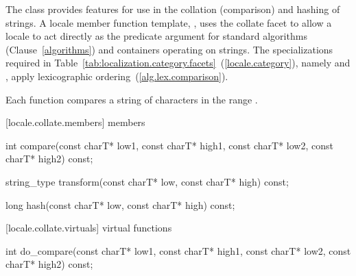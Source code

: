 \pnum
The class
provides features for use in the
collation (comparison) and hashing of strings.
A locale member function template,
,
uses the collate facet to allow a locale to act directly as the predicate
argument for standard algorithms (Clause~\ref{algorithms}) and containers operating on strings.
The specializations required in Table~\ref{tab:localization.category.facets}~(\ref{locale.category}), namely
and
,
apply lexicographic ordering~(\ref{alg.lex.comparison}).

\pnum
Each function compares a string of characters
in the range
.

[locale.collate.members]{ members}

%
\begin{itemdecl}
int compare(const charT* low1, const charT* high1,
            const charT* low2, const charT* high2) const;
\end{itemdecl}

\begin{itemdescr}
\pnum
\returns
{}
\end{itemdescr}

%
\begin{itemdecl}
string_type transform(const charT* low, const charT* high) const;
\end{itemdecl}

\begin{itemdescr}
\pnum
\returns
{}
\end{itemdescr}

%
\begin{itemdecl}
long hash(const charT* low, const charT* high) const;
\end{itemdecl}

\begin{itemdescr}
\pnum
\returns
{}
\end{itemdescr}

[locale.collate.virtuals]{ virtual functions}

%
\begin{itemdecl}
int do_compare(const charT* low1, const charT* high1,
               const charT* low2, const charT* high2) const;
\end{itemdecl}

